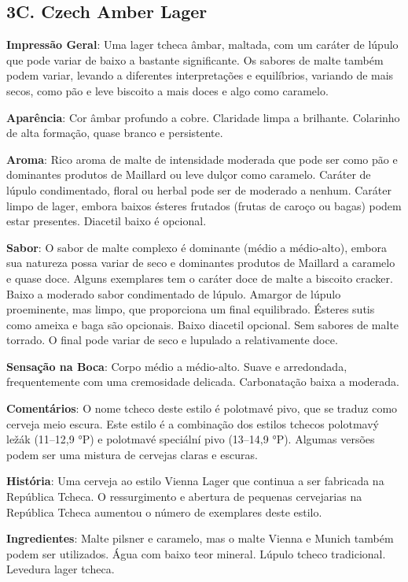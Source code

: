 \subsection*{3C. Czech Amber Lager}
\textbf{Impressão Geral}: Uma lager tcheca âmbar, maltada, com um caráter de lúpulo que pode variar de baixo a bastante significante. Os sabores de malte também podem variar, levando a diferentes interpretações e equilíbrios, variando de mais secos, como pão e leve biscoito a mais doces e algo como caramelo.

\textbf{Aparência}: Cor âmbar profundo a cobre. Claridade limpa a brilhante. Colarinho de alta formação, quase branco e persistente.

\textbf{Aroma}: Rico aroma de malte de intensidade moderada que pode ser como pão e dominantes produtos de Maillard ou leve dulçor como caramelo. Caráter de lúpulo condimentado, floral ou herbal pode ser de moderado a nenhum. Caráter limpo de lager, embora baixos ésteres frutados (frutas de caroço ou bagas) podem estar presentes. Diacetil baixo é opcional.

\textbf{Sabor}: O sabor de malte complexo é dominante (médio a médio-alto), embora sua natureza possa variar de seco e dominantes produtos de Maillard a caramelo e quase doce. Alguns exemplares tem o caráter doce de malte a biscoito cracker. Baixo a moderado sabor condimentado de lúpulo. Amargor de lúpulo proeminente, mas limpo, que proporciona um final equilibrado. Ésteres sutis como ameixa e baga são opcionais. Baixo diacetil opcional. Sem sabores de malte torrado. O final pode variar de seco e lupulado a relativamente doce.

\textbf{Sensação na Boca}: Corpo médio a médio-alto. Suave e arredondada, frequentemente com uma cremosidade delicada. Carbonatação baixa a moderada.

\textbf{Comentários}: O nome tcheco deste estilo é polotmavé pivo, que se traduz como cerveja meio escura. Este estilo é a combinação dos estilos tchecos polotmavý ležák (11–12,9 °P) e polotmavé speciální pivo (13–14,9 °P). Algumas versões podem ser uma mistura de cervejas claras e escuras.

\textbf{História}: Uma cerveja ao estilo Vienna Lager que continua a ser fabricada na República Tcheca. O ressurgimento e abertura de pequenas cervejarias na República Tcheca aumentou o número de exemplares deste estilo.

\textbf{Ingredientes}: Malte pilsner e caramelo, mas o malte Vienna e Munich também podem ser utilizados. Água com baixo teor mineral. Lúpulo tcheco tradicional. Levedura lager tcheca.

